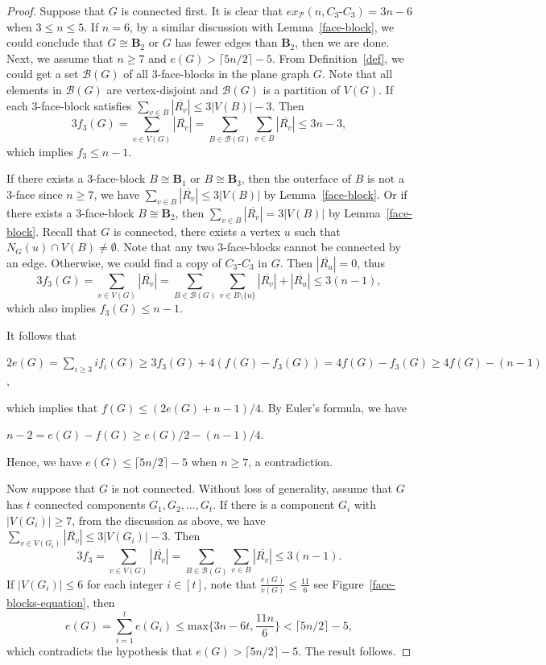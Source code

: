 \documentclass[12pt]{article}
\begin{document}
\begin{proof} 
    Suppose that $G$ is connected first.
    It is clear that $ex_{\mathcal{P}}(n,C_3\text{-}C_3)=3n-6$ when $3\leq n\leq 5$.
    If $n=6$, by a similar discussion with Lemma~\ref{face-block}, we could conclude that $G\cong\mathbf{B}_2$ or $G$ has fewer edges than $\mathbf{B}_2$, then we are done.
    Next, we assume that $n\geq 7$ and $e(G) > \lceil 5n/2 \rceil - 5$.
    From Definition~\ref{def}, we could get a set $\mathcal{B}(G)$ of all $3$-face-blocks in the plane graph $G$. 
    Note that all elements in $\mathcal{B}(G)$ are vertex-disjoint and $\mathcal{B}(G)$ is a partition of $V(G)$.
    If each $3$-face-block satisfies $\sum_{v \in B}|\overline{R_v}| \leq 3|V(B)|-3$. 
    Then $$3f_3(G)=\sum_{v \in V(G)}|\overline{R_v}|=\sum_{B \in \mathcal{B}(G)}\sum_{v \in B}|\overline{R_v}|\leq 3n-3,$$ which implies $f_3\leq n-1$.
    
    If there exists a $3$-face-block $B\cong \mathbf{B}_1$ or $B\cong \mathbf{B}_3$, then the outerface of $B$ is not a $3$-face since $n\geq7$, we have $\sum_{v \in B}|\overline{R_v}| \leq 3|V(B)|$ by Lemma~\ref{face-block}.
    Or if there exists a $3$-face-block $B\cong \mathbf{B}_2$, then $\sum_{v \in B}|\overline{R_v}| = 3|V(B)|$ by Lemma~\ref{face-block}. 
    Recall that $G$ is connected, there exists a vertex $u$ such that $N_G(u)\cap V(B)\neq\emptyset$. 
    Note that any two $3$-face-blocks cannot be connected by an edge. Otherwise, we could find a copy of $C_3\textbf{-}C_3$ in $G$.
    Then $|\overline{R_u}|=0$, thus 
    $$3f_3(G)=\sum_{v \in V(G)}|\overline{R_v}|=\sum_{B \in \mathcal{B}(G)}\sum_{v \in B\setminus \{u\}}|\overline{R_v}|+|\overline{R_u}|\leq 3(n-1),$$
    which also implies $f_3(G)\leq n-1$.
    
    It follows that
    \begin{center}
        $2e(G)=\sum_{i\geq3}if_i(G)\geq3f_3(G)+4(f(G)-f_3(G))=4f(G)-f_3(G) \geq 4f(G)-(n-1)$,
    \end{center}
    which implies that $f(G)\leq(2e(G)+n-1)/4$.  By Euler’s formula, we have 
    \begin{center}
        $n-2=e(G)-f(G)\geq e(G)/2-(n-1)/4$.
    \end{center}
    Hence, we have $e(G) \leq \lceil 5n/2 \rceil - 5$ when $n\geq 7$, a contradiction.

    Now suppose that $G$ is not connected. Without loss of generality, assume that $G$ has $t$ connected components $G_1,G_2,...,G_t$. 
    If there is a component $G_i$ with $|V(G_i)|\geq 7$, from the discussion as above, we have $\sum_{v\in V(G_i)}|\overline{R_v}|\leq 3|V(G_i)|-3$. 
    Then $$3f_3=\sum_{v \in V(G)}|\overline{R_v}|=\sum_{B \in \mathcal{B}(G)}\sum_{v \in B}|\overline{R_v}|\leq 3(n-1).$$
    If $|V(G_i)|\leq 6$ for each integer $i\in[t]$, note that $\frac{e(G)}{v(G)}\leq \frac{11}{6}$ see Figure~\ref{face-blocks-equation},
    then $$e(G)=\sum_{i=1}^te(G_i)\leq \mbox{max}\{3n-6t,\frac{11n}{6}\}<\lceil 5n/2 \rceil - 5,$$
    which contradicts the hypothesis that $e(G) > \lceil 5n/2 \rceil - 5$. The result follows.
\end{proof}
\end{document}

